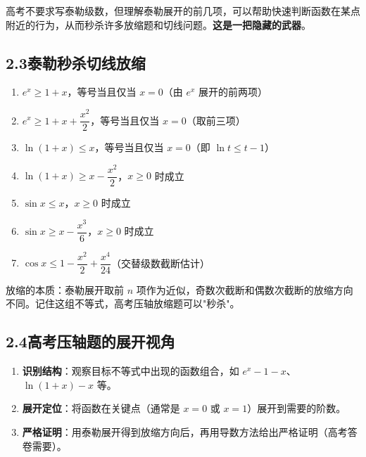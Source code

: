 \documentclass[12pt, a4paper]{ctexart}
\begin{document}
\begin{warnbox}[重要提醒]
高考不要求写泰勒级数，但理解泰勒展开的前几项，可以帮助快速判断函数在某点附近的行为，从而秒杀许多放缩题和切线问题。\textbf{这是一把隐藏的武器}。
\end{warnbox}

\subsection*{2.3\quad 泰勒秒杀切线放缩}

\begin{knowledgebox}
\begin{enumerate}[leftmargin=2em]
  \item $e^x \geq 1 + x$，等号当且仅当 $x = 0$（由 $e^x$ 展开的前两项）
  \item $e^x \geq 1 + x + \dfrac{x^2}{2}$，等号当且仅当 $x = 0$（取前三项）
  \item $\ln(1+x) \leq x$，等号当且仅当 $x = 0$（即 $\ln t \leq t - 1$）
  \item $\ln(1+x) \geq x - \dfrac{x^2}{2}$，$x \geq 0$ 时成立
  \item $\sin x \leq x$，$x \geq 0$ 时成立
  \item $\sin x \geq x - \dfrac{x^3}{6}$，$x \geq 0$ 时成立
  \item $\cos x \leq 1 - \dfrac{x^2}{2} + \dfrac{x^4}{24}$（交替级数截断估计）
\end{enumerate}
\end{knowledgebox}

\begin{tipbox}[秒杀心法]
放缩的本质：泰勒展开取前 $n$ 项作为近似，奇数次截断和偶数次截断的放缩方向不同。记住这组不等式，高考压轴放缩题可以"秒杀"。
\end{tipbox}

\subsection*{2.4\quad 高考压轴题的展开视角}

\begin{knowledgebox}[泰勒视角解题三步法]
\begin{enumerate}[leftmargin=2em]
  \item \textbf{识别结构}：观察目标不等式中出现的函数组合，如 $e^x - 1 - x$、$\ln(1+x) - x$ 等。
  \item \textbf{展开定位}：将函数在关键点（通常是 $x = 0$ 或 $x = 1$）展开到需要的阶数。
  \item \textbf{严格证明}：用泰勒展开得到放缩方向后，再用导数方法给出严格证明（高考答卷需要）。
\end{enumerate}
\end{knowledgebox}
\end{document}

